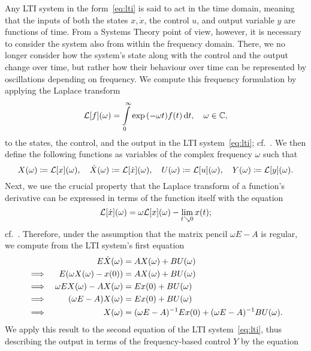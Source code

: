 Any \ac{LTI} system in the form~\eqref{eq:lti} is said to act in the time domain, meaning that the inputs of both the states $x, \dot{x}$, the control $u$, and output variable $y$ are functions of time.
From a Systems Theory point of view, however, it is necessary to consider the system also from within the frequency domain.
There, we no longer consider how the system's state along with the control and the output change over time, but rather how their behaviour over time can be represented by oscillations depending on frequency.
We compute this frequency formulation by applying the Laplace transform
\begin{equation*}
    \mathcal{L}[f](\omega) = \int\limits_0^\infty \exp{(- \omega t)} f(t) \mathop{}\!\mathrm{d} t,\quad \omega \in \mathbb{C},
\end{equation*}
to the states, the control, and the output in the \ac{LTI} system~\eqref{eq:lti}; cf.~\cite{Arendt2011}.
We then define the following functions as variables of the complex frequency $\omega$ such that
\begin{equation}
    X(\omega) \coloneqq \mathcal{L}[x](\omega),\quad \dot{X}(\omega) \coloneqq \mathcal{L}[\dot{x}](\omega),\quad U(\omega) \coloneqq \mathcal{L}[u](\omega),\quad Y(\omega) \coloneqq \mathcal{L}[y](\omega).
\end{equation}
Next, we use the crucial property that the Laplace transform of a function's derivative can be expressed in terms of the function itself with the equation
\begin{equation*}
    \mathcal{L}[\dot{x}](\omega) = \omega \mathcal{L}[x](\omega) - \lim\limits_{t \searrow 0} x(t);
\end{equation*}
cf.~\cite[Theorem~9.1]{Doetsch1974}.
Therefore, under the assumption that the matrix pencil $\omega E - A$ is regular, we compute from the \ac{LTI} system's first equation
\begin{alignat*}{3}
     & & E \dot{X}(\omega) &= A X(\omega) + B U(\omega) \\
    \implies & & E (\omega X(\omega) - x(0)) &= A X(\omega) + B U(\omega) \\
    \implies & & \omega E X(\omega) - A X(\omega) &= E x(0) + B U(\omega) \\
    \implies & & (\omega E - A) X(\omega) &= E x(0) + B U(\omega) \\
    \implies & & X(\omega) &= (\omega E - A)\inv E x(0) + (\omega E - A)\inv B U(\omega).
\end{alignat*}
We apply this result to the second equation of the \ac{LTI} system~\eqref{eq:lti}, thus describing the output in terms of the frequency-based control $Y$ by the equation
